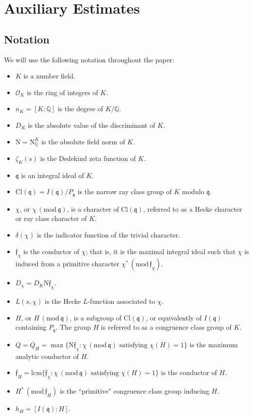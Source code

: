 \documentclass[12pt,psamsfonts]{amsart}
\theoremstyle{definition}
\theoremstyle{remark}
\numberwithin{equation}{section}
\newcounter{notation}
\theoremstyle{plain}
\theoremstyle{remark}
\renewcommand{\1}{ {\bf 1}}
\newcommand{\kf}{\mathfrak{f}}
\renewcommand{\pmod}[1]{\, (\mathrm{mod} {\, #1})}
\newcommand{\N}{\mathrm{N}}
\newcommand{\kq}{\mathfrak{q}}
\newcommand{\Q}{\mathbb{Q}}
\begin{document}
\section{Auxiliary Estimates}
\label{HeckeLFunctions} 


\subsection{Notation} 
\label{subsec:notation}
We will use the following notation throughout the paper:
\begin{itemize}
	\item $K$ is a number field.
	\item $\mathcal{O}_K$ is the ring of integers of $K$.
	\item $n_K = [K:\mathbb{Q}]$ is the degree of $K/\mathbb{Q}$.
	\item $D_K$ is the absolute value of the discriminant of $K$.
	\item $\N = \N^K_{\Q}$ is the absolute field norm of $K$. 
	\item $\zeta_K(s)$ is the Dedekind zeta function of $K$.
	\item $\mathfrak{q}$ is an integral ideal of $K$.
	\item $\mathrm{Cl}(\mathfrak{q}) = I(\mathfrak{q})/P_{\mathfrak{q}}$ is the narrow ray class group of $K$ modulo $\mathfrak{q}$.
	\item $\chi$, or $\chi \pmod{\kq}$, is a character of $\mathrm{Cl}(\kq)$, referred to as a Hecke character or ray class character of $K$.
	\item $\delta(\chi)$ is the indicator function of the trivial character.
	\item $\kf_{\chi}$ is the conductor of $\chi$; that is, it is the maximal integral ideal such that $\chi$ is induced from a primitive character $\chi^* \pmod{\kf_{\chi}}$.
	\item $D_{\chi} = D_K \N\kf_{\chi}$.
	\item $L(s,\chi)$ is the Hecke $L$-function associated to $\chi$.
	\item $H$, or $H \pmod{\kq}$, is a subgroup of $\mathrm{Cl}(\mathfrak{q})$, or equivalently of $I(\mathfrak{q})$ containing $P_{\mathfrak{q}}$. The group $H$ is referred to as a congruence class group of $K$. 
 	\item $Q = Q_H = \max\{ \N\kf_{\chi} : \chi \pmod{\kq} \text{ satisfying } \chi(H) = 1\}$ is the maximum analytic conductor of $H$. 
	\item $\kf_H = \mathrm{lcm}\{ \kf_{\chi} : \chi \pmod{\kq} \text{ satisfying } \chi(H) = 1\}$ is the conductor of $H$.
	\item $H^* \pmod{\kf_H}$ is the ``primitive" congruence class group inducing $H$.
	\item $h_H = [I(\kq):H]$.   
\end{itemize}
\end{document}
